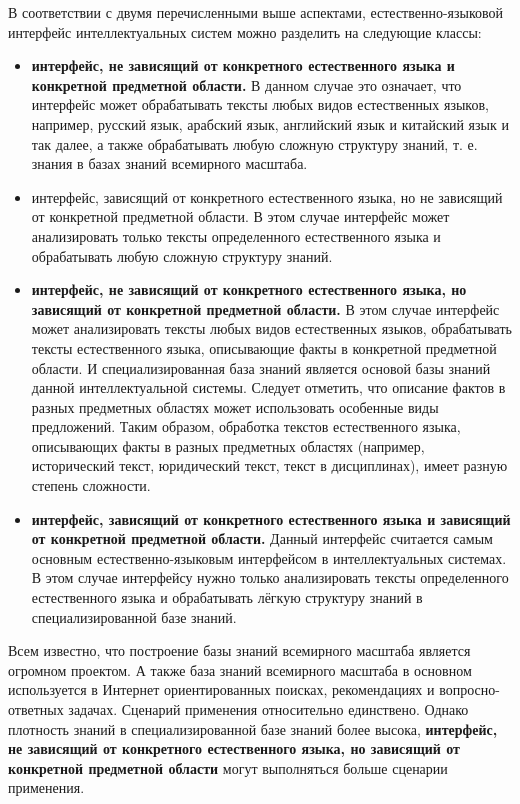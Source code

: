 В соответствии с двумя перечисленными выше аспектами, естественно-языковой интерфейс интеллектуальных систем можно разделить на следующие классы:
\begin{itemize}
	\item \textbf{интерфейс, не зависящий от конкретного естественного языка и конкретной предметной области.} В данном случае это означает, что интерфейс может обрабатывать тексты любых видов естественных языков, например, русский язык, арабский язык, английский язык и китайский язык и так далее, а также обрабатывать любую сложную структуру знаний, т. е. знания в базах знаний всемирного масштаба.
	\item интерфейс, зависящий от конкретного естественного языка, но не зависящий от конкретной предметной области. В этом случае интерфейс может анализировать только тексты определенного естественного языка и обрабатывать любую сложную структуру знаний. 
	\item \textbf{интерфейс, не зависящий от конкретного естественного языка, но зависящий от конкретной предметной области.} В этом случае интерфейс может анализировать тексты любых видов естественных языков, обрабатывать тексты естественного языка, описывающие факты в конкретной предметной области. И специализированная база знаний является основой базы знаний данной интеллектуальной системы. Следует отметить, что описание фактов в разных предметных областях может использовать особенные виды предложений. Таким образом, обработка текстов естественного языка, описывающих факты в разных предметных областях (например, исторический текст, юридический текст, текст в дисциплинах), имеет разную степень сложности.
	\item \textbf{интерфейс, зависящий от конкретного естественного языка и зависящий от конкретной предметной области.} Данный интерфейс считается самым основным естественно-языковым интерфейсом в интеллектуальных системах. В этом случае интерфейсу нужно только анализировать тексты определенного естественного языка и обрабатывать лёгкую структуру знаний в специализированной базе знаний. 	
\end{itemize}

Всем известно, что построение базы знаний всемирного масштаба является огромном проектом. А также база знаний всемирного масштаба в основном используется в Интернет ориентированных поисках, рекомендациях и вопросно-ответных задачах. Сценарий применения относительно единствено. Однако плотность знаний в специализированной базе знаний более высока, \textbf{интерфейс, не зависящий от конкретного естественного языка, но зависящий от конкретной предметной области} могут выполняться больше сценарии применения. 


